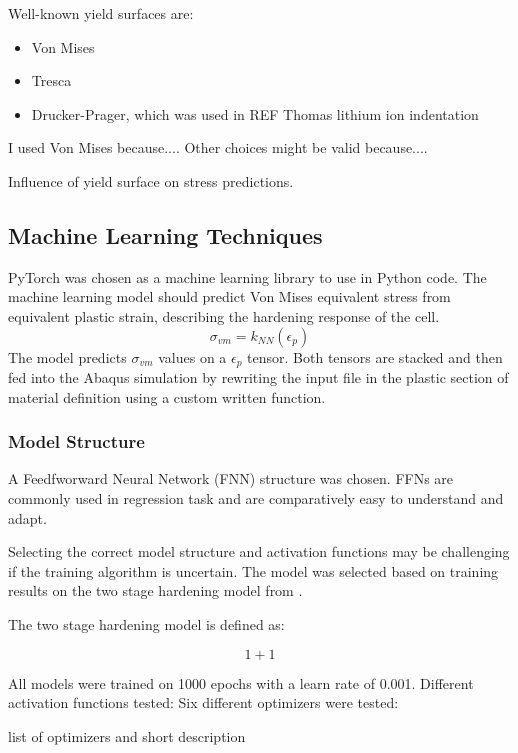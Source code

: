 Well-known yield surfaces are:
\begin{itemize}
    \item Von Mises
    \item Tresca
    \item Drucker-Prager, which was used in REF Thomas lithium ion indentation
\end{itemize}

I used Von Mises because....
Other choices might be valid because....

Influence of yield surface on stress predictions.

\subsection{Machine Learning Techniques}
PyTorch was chosen as a machine learning library to use in Python code. The machine learning model should predict Von Mises equivalent stress from equivalent plastic strain, describing the hardening response of the cell.
\begin{equation}
    \sigma_{vm} = k_{NN}(\epsilon_p)
\end{equation}
The model predicts $\sigma_{vm}$ values on a $\epsilon_p$ tensor. Both tensors are stacked and then fed into the Abaqus simulation by rewriting the input file in the plastic section of material definition using a custom written function.

\subsubsection{Model Structure}
A Feedfworward Neural Network (FNN) structure was chosen. FFNs are commonly used in regression task and are comparatively easy to understand and adapt.

Selecting the correct model structure and activation functions may be challenging if the training algorithm is uncertain. The model was selected based on training results on the two stage hardening model from \cite{Tancogne-Ind}.

The two stage hardening model is defined as:

\begin{equation}
    1+1
\end{equation}

All models were trained on 1000 epochs with a learn rate of 0.001.
Different activation functions tested:
Six different optimizers were tested:

list of optimizers and short description

